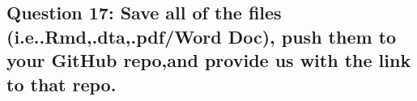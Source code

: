 \documentclass[
]{article}
\begin{document}
\hypertarget{question-17-save-all-of-the-files-i.e..rmd.dta.pdfword-doc-push-them-to-your-github-repoand-provide-us-with-the-link-to-that-repo.}{%
\subsection{Question 17: Save all of the files (i.e..Rmd,.dta,.pdf/Word
Doc), push them to your GitHub repo,and provide us with the link to that
repo.}\label{question-17-save-all-of-the-files-i.e..rmd.dta.pdfword-doc-push-them-to-your-github-repoand-provide-us-with-the-link-to-that-repo.}}
\end{document}
